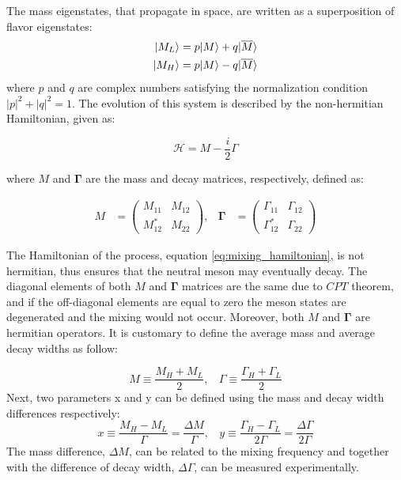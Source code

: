 The mass eigenstates, that propagate in space, are written as a superposition of flavor eigenstates:
\begin{equation}
    \begin{split}
        \lvert M_L\rangle = p \lvert M\rangle + q \lvert\overline{M}\rangle \\
        \lvert M_H\rangle = p \lvert M\rangle - q \lvert\overline{M}\rangle \\
    \end{split}
\end{equation}
 where $p$ and $q$ are complex numbers satisfying the normalization condition $|p|^{2}+|q|^{2} = 1$. 
 The evolution of this system is described by the non-hermitian Hamiltonian, given as:

\begin{equation}
\label{eq:mixing_hamiltonian}
    \mathcal{H}  = M - \frac{i}{2} \Gamma
\end{equation}

where $M$ and $\bm{\Gamma}$ are the mass and decay matrices, respectively, defined as:

\begin{align}
    M &= \left( \begin{matrix} M_{11} & M_{12}  \\ M_{12}^{*} & M_{22} \end{matrix} \right), & 
    \bm{\Gamma} &=  \left( \begin{matrix} \Gamma_{11} & \Gamma_{12}  \\ \Gamma_{12}^{*} & \Gamma_{22} \end{matrix} \right) 
\end{align}

The Hamiltonian of the process, equation \ref{eq:mixing_hamiltonian}, is not hermitian, thus ensures that the neutral meson may eventually decay. The diagonal elements of both $M$ and $\bm{\Gamma}$ matrices are the same due to $CPT$  theorem, and if the off-diagonal elements are equal to zero the meson states are degenerated and the mixing would not occur. Moreover, both  $M$ and $\bm{\Gamma}$ are hermitian operators. It is customary to define the average mass and average decay widths as follow:

\begin{equation}
\label{eq:mass_gamma}
    M \equiv \frac{M_{H} + M_{L}}{2}, ~~~~
    \Gamma \equiv \frac{\Gamma_{H} + \Gamma_{L}}{2}
\end{equation}
Next, two parameters x and y can be defined using the mass and decay width differences respectively:
\begin{equation}
\label{eq:x_y}
    x \equiv \frac{M_{H} - M_{L}}{\Gamma} = \frac{\Delta M}{\Gamma}, ~~~~
    y \equiv \frac{\Gamma_{H} - \Gamma_{L}}{2 \Gamma} = \frac{\Delta \Gamma}{2 \Gamma}
\end{equation}
The mass difference, $\Delta M$, can be related to the mixing frequency and together with the difference of decay width, $\Delta \Gamma$, can be measured experimentally.

